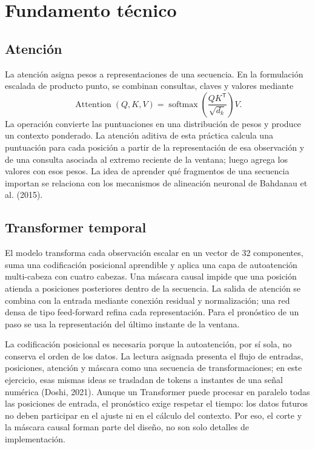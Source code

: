 \documentclass[12pt]{article}
\begin{document}
\section{Fundamento técnico}
\subsection{Atención}
La atención asigna pesos a representaciones de una secuencia. En la formulación escalada de producto punto, se combinan consultas, claves y valores mediante
\begin{equation}
\operatorname{Attention}(Q,K,V)=\operatorname{softmax}\left(\frac{QK^{\mathsf T}}{\sqrt{d_k}}\right)V.
\end{equation}
La operación convierte las puntuaciones en una distribución de pesos y produce un contexto ponderado. La atención aditiva de esta práctica calcula una puntuación para cada posición a partir de la representación de esa observación y de una consulta asociada al extremo reciente de la ventana; luego agrega los valores con esos pesos. La idea de aprender qué fragmentos de una secuencia importan se relaciona con los mecanismos de alineación neuronal de Bahdanau et al. (2015).

\subsection{Transformer temporal}
El modelo transforma cada observación escalar en un vector de 32 componentes, suma una codificación posicional aprendible y aplica una capa de autoatención multi-cabeza con cuatro cabezas. Una máscara causal impide que una posición atienda a posiciones posteriores dentro de la secuencia. La salida de atención se combina con la entrada mediante conexión residual y normalización; una red densa de tipo feed-forward refina cada representación. Para el pronóstico de un paso se usa la representación del último instante de la ventana.

La codificación posicional es necesaria porque la autoatención, por sí sola, no conserva el orden de los datos. La lectura asignada presenta el flujo de entradas, posiciones, atención y máscara como una secuencia de transformaciones; en este ejercicio, esas mismas ideas se trasladan de tokens a instantes de una señal numérica (Doshi, 2021). Aunque un Transformer puede procesar en paralelo todas las posiciones de entrada, el pronóstico exige respetar el tiempo: los datos futuros no deben participar en el ajuste ni en el cálculo del contexto. Por eso, el corte y la máscara causal forman parte del diseño, no son solo detalles de implementación.
\end{document}

